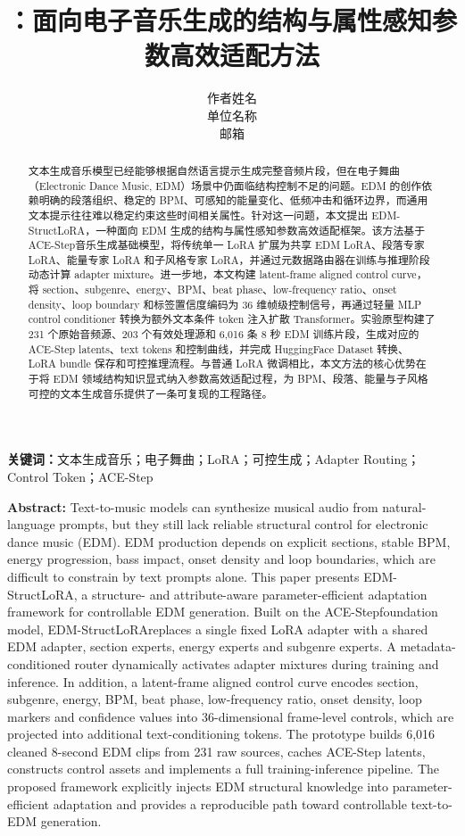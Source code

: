 \documentclass[UTF8,a4paper,zihao=-4,fontset=none]{ctexart}
\title{\bfseries \modelname：面向电子音乐生成的结构与属性感知参数高效适配方法}
\author{作者姓名\\单位名称\\邮箱}
\date{}
\newcommand{\modelname}{EDM-StructLoRA}
\newcommand{\basemodel}{ACE-Step}
\begin{document}
\maketitle

\begin{abstract}
文本生成音乐模型已经能够根据自然语言提示生成完整音频片段，但在电子舞曲（Electronic Dance Music, EDM）场景中仍面临结构控制不足的问题。EDM 的创作依赖明确的段落组织、稳定的 BPM、可感知的能量变化、低频冲击和循环边界，而通用文本提示往往难以稳定约束这些时间相关属性。针对这一问题，本文提出 \modelname，一种面向 EDM 生成的结构与属性感知参数高效适配框架。该方法基于 \basemodel 音乐生成基础模型，将传统单一 LoRA 扩展为共享 EDM LoRA、段落专家 LoRA、能量专家 LoRA 和子风格专家 LoRA，并通过元数据路由器在训练与推理阶段动态计算 adapter mixture。进一步地，本文构建 latent-frame aligned control curve，将 section、subgenre、energy、BPM、beat phase、low-frequency ratio、onset density、loop boundary 和标签置信度编码为 36 维帧级控制信号，再通过轻量 MLP control conditioner 转换为额外文本条件 token 注入扩散 Transformer。实验原型构建了 231 个原始音频源、203 个有效处理源和 6,016 条 8 秒 EDM 训练片段，生成对应的 ACE-Step latents、text tokens 和控制曲线，并完成 HuggingFace Dataset 转换、LoRA bundle 保存和可控推理流程。与普通 LoRA 微调相比，本文方法的核心优势在于将 EDM 领域结构知识显式纳入参数高效适配过程，为 BPM、段落、能量与子风格可控的文本生成音乐提供了一条可复现的工程路径。
\end{abstract}

\noindent\textbf{关键词：}文本生成音乐；电子舞曲；LoRA；可控生成；Adapter Routing；Control Token；ACE-Step

\vspace{0.6em}
\noindent\textbf{Abstract:}
Text-to-music models can synthesize musical audio from natural-language prompts, but they still lack reliable structural control for electronic dance music (EDM). EDM production depends on explicit sections, stable BPM, energy progression, bass impact, onset density and loop boundaries, which are difficult to constrain by text prompts alone. This paper presents \modelname, a structure- and attribute-aware parameter-efficient adaptation framework for controllable EDM generation. Built on the \basemodel foundation model, \modelname replaces a single fixed LoRA adapter with a shared EDM adapter, section experts, energy experts and subgenre experts. A metadata-conditioned router dynamically activates adapter mixtures during training and inference. In addition, a latent-frame aligned control curve encodes section, subgenre, energy, BPM, beat phase, low-frequency ratio, onset density, loop markers and confidence values into 36-dimensional frame-level controls, which are projected into additional text-conditioning tokens. The prototype builds 6,016 cleaned 8-second EDM clips from 231 raw sources, caches ACE-Step latents, constructs control assets and implements a full training-inference pipeline. The proposed framework explicitly injects EDM structural knowledge into parameter-efficient adaptation and provides a reproducible path toward controllable text-to-EDM generation.
\end{document}
